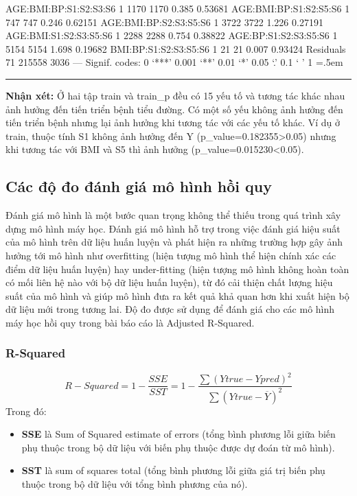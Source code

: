 \documentclass[runningheads]{llncs}
\newenvironment{lcverbatim}
 {\SaveVerbatim{cverb}}
 {\endSaveVerbatim
  \flushleft\fboxrule=0pt\fboxsep=.5em
  \colorbox{cverbbg}{%
    \makebox[\dimexpr\linewidth-2\fboxsep][l]{\BUseVerbatim{cverb}}%
  }
  \endflushleft
}
\begin{document}
\begin{lcverbatim}
AGE:BMI:BP:S1:S2:S3:S6  1   1170    1170   0.385  0.53681    
AGE:BMI:BP:S1:S2:S5:S6  1    747     747   0.246  0.62151    
AGE:BMI:BP:S2:S3:S5:S6  1   3722    3722   1.226  0.27191    
AGE:BMI:S1:S2:S3:S5:S6  1   2288    2288   0.754  0.38822    
AGE:BP:S1:S2:S3:S5:S6   1   5154    5154   1.698  0.19682    
BMI:BP:S1:S2:S3:S5:S6   1     21      21   0.007  0.93424    
Residuals              71 215558    3036                     
---
Signif. codes:  0 ‘***’ 0.001 ‘**’ 0.01 ‘*’ 0.05 ‘.’ 0.1 ‘ ’ 1
\end{lcverbatim}
\hrule
\vspace{0.5cm}

\textbf{Nhận xét:}
Ở hai tập train và train\_p đều có 15 yếu tố và tương tác khác nhau ảnh hưởng đến tiến triển bệnh tiểu đường. Có một số yếu không ảnh hưởng đến tiến triển bệnh nhưng lại ảnh hưởng khi tương tác với các yếu tố khác. Ví dụ ở train, thuộc tính S1 không ảnh hưởng đến Y (p\_value=0.182355>0.05) nhưng khi tương tác với BMI và S5 thì ảnh hưởng (p\_value=0.015230<0.05). 

\subsection{Các độ đo đánh giá mô hình hồi quy}

Đánh giá mô hình là một bước quan trọng không thể thiếu trong quá trình xây dựng mô hình máy học. Đánh giá mô hình hỗ trợ trong việc đánh giá hiệu suất của mô hình trên dữ liệu huấn luyện và phát hiện ra những trường hợp gây ảnh hưởng tới mô hình như overfitting (hiện tượng mô hình thể hiện chính xác các điểm dữ liệu huấn luyện) hay under-fitting (hiện tượng mô hình không hoàn toàn có mối liên hệ nào với bộ dữ liệu huấn luyện), từ đó cải thiện chất lượng hiệu suất của mô hình và giúp mô hình đưa ra kết quả khả quan hơn khi xuất hiện bộ dữ liệu mới trong tương lai. Độ đo được sử dụng để đánh giá cho các mô hình máy học hồi quy trong bài báo cáo là Adjusted R-Squared.


\subsubsection{R-Squared}
\begin{equation}
	R-Squared = 1- \frac{SSE}{SST} =  1 - \frac{\sum (Ytrue - Ypred)^2}{\sum (Ytrue - \overline{Y})^2}
\end{equation}
Trong đó:\\
\begin{itemize}
	\item  \textbf{SSE} là Sum of Squared estimate of errors (tổng bình phương lỗi giữa biến phụ thuộc trong bộ dữ liệu với biến phụ thuộc được dự đoán từ mô hình).\\
	\item \textbf{SST} là sum of squares total (tổng bình phương lỗi giữa giá trị biến phụ thuộc trong bộ dữ liệu với tổng bình phương của nó).\\
\end{itemize}
\end{document}
